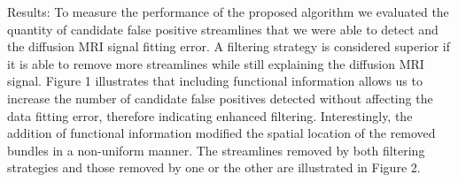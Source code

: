 Results:
To measure the performance of the proposed algorithm we evaluated the quantity of candidate false positive streamlines
that we were able to detect and the diffusion MRI signal fitting error. A filtering strategy is considered superior if it is able
to remove more streamlines while still explaining the diffusion MRI signal. Figure 1 illustrates that including functional
information allows us to increase the number of candidate false positives detected without affecting the data fitting error,
therefore indicating enhanced filtering. Interestingly, the addition of functional information modified the spatial location of
the removed bundles in a non-uniform manner. The streamlines removed by both filtering strategies and those removed
by one or the other are illustrated in Figure 2.

